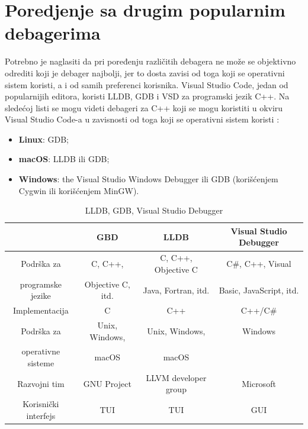\documentclass[a4paper]{article}
\begin{document}
\section{Poredjenje sa drugim popularnim debagerima}
\label{sec:naslovN}

Potrebno je naglasiti da pri poređenju različitih debagera ne može se objektivno odrediti koji je debager najbolji, jer to dosta zavisi od toga koji se operativni sistem koristi, a i od samih preferenci korisnika. Visual Studio Code, jedan od popularnijih editora, koristi LLDB, GDB i VSD za programski jezik C++. Na sledećoj listi se mogu videti debageri za C++ koji se mogu koristiti u okviru Visual Studio Code-a u zavisnosti od toga koji se operativni sistem koristi \cite{vsc_support}:
\begin{itemize}
	\item \textbf{Linux}: GDB;
	\item \textbf{macOS}: LLDB ili GDB;
	\item \textbf{Windows}: the Visual Studio Windows Debugger ili GDB (korišćenjem Cygwin ili korišćenjem MinGW).
\end{itemize}

\begin{table}[ht!]
	\begin{center}
		\caption{LLDB, GDB, Visual Studio Debugger \cite{gdb}\cite{lldb}\cite{vsd}}
		\label{table:tabela_poredjenje}
		\begin{footnotesize}
			\begin{tabular}{| c | c | c | c |}
				\hline
				& \cellcolor{red!60}GBD & \cellcolor{red!60}LLDB & \cellcolor{red!60}Visual Studio Debugger \\ 
				\hline
				\cellcolor{orange!60}Podrška za& \cellcolor{yellow!60}C, C++, & \cellcolor{yellow!60}C, C++, Objective C & \cellcolor{yellow!60}C\#, C++, Visual \\ 
				\cellcolor{orange!60}programske jezike & \cellcolor{yellow!60}Objective C, itd. & \cellcolor{yellow!60}Java, Fortran, itd. & \cellcolor{yellow!60}Basic, JavaScript, itd. \\ 
				\hline 
				\cellcolor{orange!60}Implementacija & \cellcolor{yellow!60}C & \cellcolor{yellow!60}C++ & \cellcolor{yellow!60}C++/C\# \\
				\hline
				\cellcolor{orange!60}Podrška za& \cellcolor{yellow!60}Unix, Windows,& \cellcolor{yellow!60}Unix, Windows,& \cellcolor{yellow!60}Windows\\
				\cellcolor{orange!60}operativne sisteme & \cellcolor{yellow!60}macOS & \cellcolor{yellow!60}macOS & \cellcolor{yellow!60}\\
				\hline
				\cellcolor{orange!60}Razvojni tim & \cellcolor{yellow!60}GNU Project & \cellcolor{yellow!60}LLVM developer group & \cellcolor{yellow!60}Microsoft \\
				\hline
				\cellcolor{orange!60}Korisnički interfejs & \cellcolor{yellow!60}TUI & \cellcolor{yellow!60}TUI & \cellcolor{yellow!60}GUI\\
				\hline
			\end{tabular}
		\end{footnotesize}
	\end{center}
\end{table}
\end{document}
